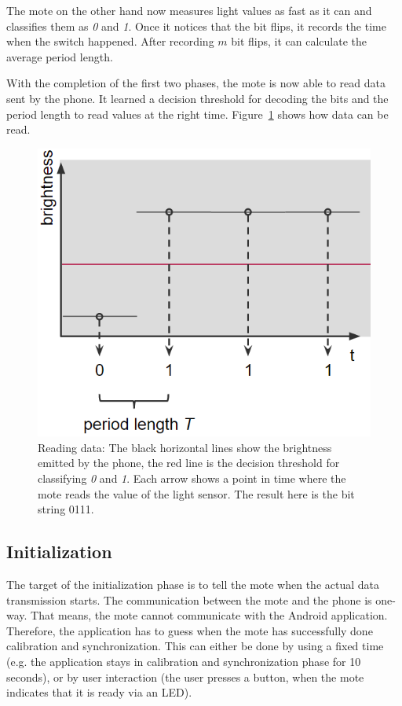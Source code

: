 \documentclass{sig-alternate} %
\begin{document}
The mote on the other hand now measures light values as fast as it can and classifies them as \textit{0} and \textit{1}.
Once it notices that the bit flips, it records the time when the switch happened.
After recording $m$ bit flips, it can calculate the average period length.

With the completion of the first two phases, the mote is now able to read data sent by the phone.
It learned a decision threshold for decoding the bits and the period length to read values at the right time.
Figure~\ref{fig:read_a_bit} shows how data can be read.

\begin{figure}
	\centering
	\includegraphics[scale=.4]{images/reading_data.png}
	\caption{Reading data: The black horizontal lines show the brightness emitted by the phone, the red line is the decision threshold for classifying \textit{0} and \textit{1}. Each arrow shows a point in time where the mote reads the value of the light sensor. The result here is the bit string 0111.}
	\label{fig:read_a_bit}
\end{figure}

\subsection{Initialization}
\label{sub:initialization}

The target of the initialization phase is to tell the mote when the actual data transmission starts.
The communication between the mote and the phone is one-way.
That means, the mote cannot communicate with the Android application.
Therefore, the application has to guess when the mote has successfully done calibration and synchronization.
This can either be done by using a fixed time (e.g. the application stays in calibration and synchronization phase for 10 seconds), or by user interaction (the user presses a button, when the mote indicates that it is ready via an LED).
\end{document}
